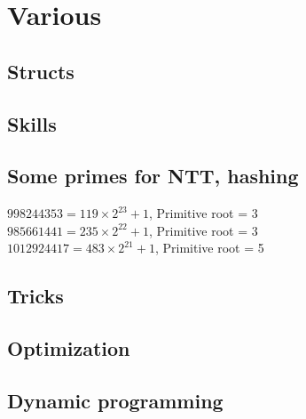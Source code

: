 \chapter{Various}

\section{Structs}

\section{Skills}

\section{Some primes for NTT, hashing}
$998244353 = 119 \times 2^{23} + 1$, Primitive root = 3 \\
$985661441 = 235 \times 2^{22} + 1$, Primitive root = 3 \\
$1012924417 = 483 \times 2^{21} + 1$, Primitive root = 5

\section{Tricks}

\section{Optimization}

\section{Dynamic programming}

